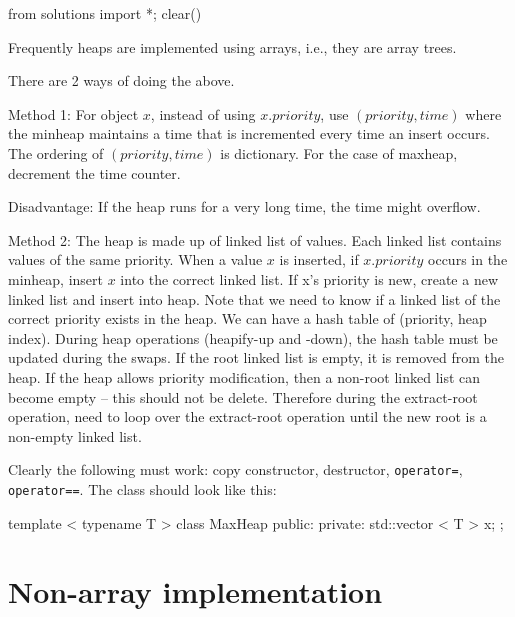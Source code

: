 \begin{python0}
from solutions import *; clear()
\end{python0}

Frequently heaps are implemented using arrays,
i.e., they are array trees.





There are 2 ways of doing the above.

Method 1:
For object $x$, instead of using $x.priority$,
use $(priority, time)$ where the minheap maintains
a time that is incremented every time
an insert occurs. The ordering of $(priority, time)$
is dictionary.
For the case of maxheap, decrement the time counter.

Disadvantage: If the heap runs for a very long time,
the time might overflow.

Method 2:
The heap is made up of linked list of values.
Each linked list contains values of the same priority.
When a value $x$ is inserted, if $x.priority$ occurs in
the minheap, insert $x$ into the correct linked list.
If x's priority is new, create a new linked list and
insert into heap.
Note that we need to know if a linked list of the
correct priority exists in the heap.
We can have a hash table of (priority, heap index).
During heap operations (heapify-up and -down), the
hash table must be updated during the swaps.
If the root linked list is empty, it is removed from the heap.
If the heap allows priority modification, then
a non-root linked list can become empty -- this should not be
delete.
Therefore during the extract-root operation,
need to loop over the extract-root operation until
the new root is a non-empty linked list.



Clearly the following must work: copy constructor, destructor,
\verb!operator=!, \verb!operator==!.
The class should look like this:
\begin{console}
template < typename T >
class MaxHeap
{
public:
private:
    std::vector < T > x;
};
\end{console}



\section{Non-array implementation}

